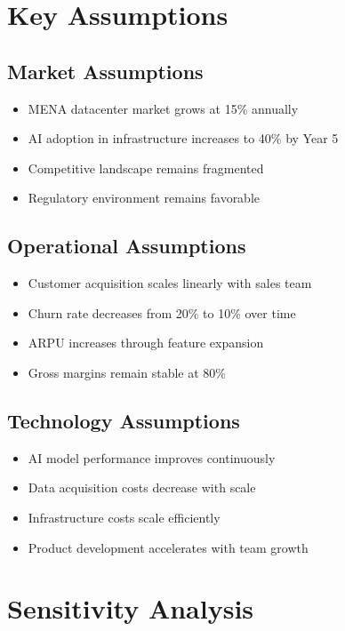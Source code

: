 \documentclass[business]{../templates/infraradar-main}
\begin{document}
\section{Key Assumptions}

\subsection{Market Assumptions}
\begin{itemize}
    \item MENA datacenter market grows at 15\% annually
    \item AI adoption in infrastructure increases to 40\% by Year 5
    \item Competitive landscape remains fragmented
    \item Regulatory environment remains favorable
\end{itemize}

\subsection{Operational Assumptions}
\begin{itemize}
    \item Customer acquisition scales linearly with sales team
    \item Churn rate decreases from 20\% to 10\% over time
    \item ARPU increases through feature expansion
    \item Gross margins remain stable at 80\%
\end{itemize}

\subsection{Technology Assumptions}
\begin{itemize}
    \item AI model performance improves continuously
    \item Data acquisition costs decrease with scale
    \item Infrastructure costs scale efficiently
    \item Product development accelerates with team growth
\end{itemize}

\section{Sensitivity Analysis}
\end{document}
